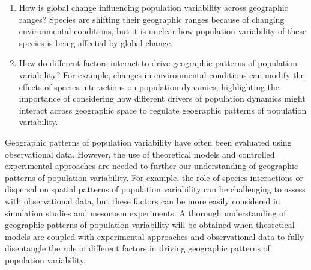 \begin{enumerate}
\item How is global change influencing population variability across geographic ranges? Species are shifting their geographic ranges because of changing environmental conditions, but it is unclear how population variability of these species is being affected by global change.  
\item How do different factors interact to drive geographic patterns of population variability? For example, changes in environmental conditions can modify the effects of species interactions on population dynamics, highlighting the importance of considering how different drivers of population dynamics might interact across geographic space to regulate geographic patterns of population variability.  
\end{enumerate}


Geographic patterns of population variability have often been evaluated using observational data. However, the use of theoretical models and controlled experimental approaches are needed to further our understanding of geographic patterns of population variability. For example, the role of species interactions or dispersal on spatial patterns of population variability can be challenging to assess with observational data, but these factors can be more easily considered in simulation studies and mesocosm experiments. A thorough understanding of geographic patterns of population variability will be obtained when theoretical models are coupled with experimental approaches and observational data to fully disentangle the role of different factors in driving geographic patterns of population variability.


